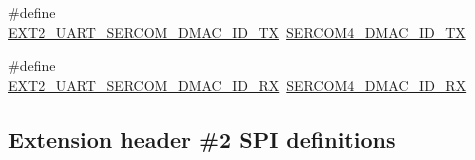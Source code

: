 \begin{DoxyCompactItemize}
\item 
\#define \mbox{\hyperlink{group__samd21__xplained__pro__features__group_gaedecf0445fac0f99d853b86ede2b6fbc}{E\+X\+T2\+\_\+\+U\+A\+R\+T\+\_\+\+S\+E\+R\+C\+O\+M\+\_\+\+D\+M\+A\+C\+\_\+\+I\+D\+\_\+\+TX}}~\mbox{\hyperlink{sercom4_8h_aeedc76f0fc42937b376b147db4319b37}{S\+E\+R\+C\+O\+M4\+\_\+\+D\+M\+A\+C\+\_\+\+I\+D\+\_\+\+TX}}
\item 
\#define \mbox{\hyperlink{group__samd21__xplained__pro__features__group_ga6f7d99bf930ce4bca3b0e258ef8f6eac}{E\+X\+T2\+\_\+\+U\+A\+R\+T\+\_\+\+S\+E\+R\+C\+O\+M\+\_\+\+D\+M\+A\+C\+\_\+\+I\+D\+\_\+\+RX}}~\mbox{\hyperlink{sercom4_8h_a7de8cf9e95745263a230853b13188522}{S\+E\+R\+C\+O\+M4\+\_\+\+D\+M\+A\+C\+\_\+\+I\+D\+\_\+\+RX}}
\end{DoxyCompactItemize}
\subsection*{Extension header \#2 S\+PI definitions}
